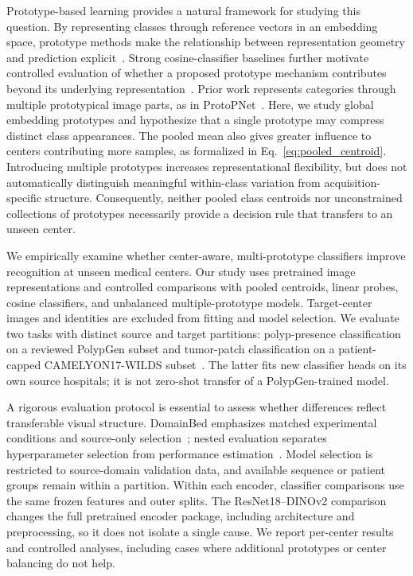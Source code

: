 Prototype-based learning provides a natural framework for studying this question. By representing classes through reference vectors in an embedding space, prototype methods make the relationship between representation geometry and prediction explicit~\cite{snell2017prototypical}. Strong cosine-classifier baselines further motivate controlled evaluation of whether a proposed prototype mechanism contributes beyond its underlying representation~\cite{chen2019closer}. Prior work represents categories through multiple prototypical image parts, as in ProtoPNet~\cite{chen2019protopnet}. Here, we study global embedding prototypes and hypothesize that a single prototype may compress distinct class appearances. The pooled mean also gives greater influence to centers contributing more samples, as formalized in Eq.~\ref{eq:pooled_centroid}. Introducing multiple prototypes increases representational flexibility, but does not automatically distinguish meaningful within-class variation from acquisition-specific structure. Consequently, neither pooled class centroids nor unconstrained collections of prototypes necessarily provide a decision rule that transfers to an unseen center.

We empirically examine whether center-aware, multi-prototype classifiers improve recognition at unseen medical centers. Our study uses pretrained image representations and controlled comparisons with pooled centroids, linear probes, cosine classifiers, and unbalanced multiple-prototype models. Target-center images and identities are excluded from fitting and model selection. We evaluate two tasks with distinct source and target partitions: polyp-presence classification on a reviewed PolypGen subset and tumor-patch classification on a patient-capped CAMELYON17-WILDS subset~\cite{bandi2019camelyon,koh2021wilds}. The latter fits new classifier heads on its own source hospitals; it is not zero-shot transfer of a PolypGen-trained model.

A rigorous evaluation protocol is essential to assess whether differences reflect transferable visual structure. DomainBed emphasizes matched experimental conditions and source-only selection~\cite{gulrajani2021domainbed}; nested evaluation separates hyperparameter selection from performance estimation~\cite{varma2006bias}. Model selection is restricted to source-domain validation data, and available sequence or patient groups remain within a partition. Within each encoder, classifier comparisons use the same frozen features and outer splits. The ResNet18--DINOv2 comparison changes the full pretrained encoder package, including architecture and preprocessing, so it does not isolate a single cause. We report per-center results and controlled analyses, including cases where additional prototypes or center balancing do not help.

